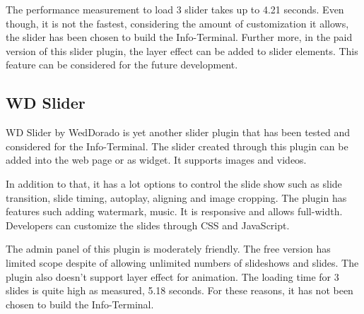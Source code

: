 The performance measurement to load 3 slider takes up to 4.21 seconds. Even though, it is not the fastest, considering the amount of customization it allows, the slider has been chosen to build the Info-Terminal. Further more, in the paid version of this slider plugin, the layer effect can be added to slider elements. This feature can be considered for the future development.

\subsection{WD Slider}
WD Slider by WedDorado is yet another slider plugin that has been tested and considered for the Info-Terminal. The slider created through this plugin can be added into the web page or as widget. It supports images and videos.

In addition to that, it has a lot options to control the slide show such as slide transition, slide timing, autoplay, aligning and image cropping. The plugin has features such adding watermark, music. It is responsive and allows full-width. Developers can customize the slides through CSS and JavaScript.

The admin panel of this plugin is moderately friendly. The free version has limited scope despite of allowing unlimited numbers of slideshows and slides. The plugin also doesn't support layer effect for animation. The loading time for 3 slides is quite high as measured, 5.18 seconds. For these reasons, it has not been chosen to build the Info-Terminal.